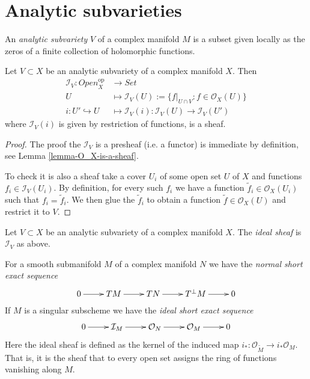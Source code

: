 \section{Analytic subvarieties}
\label{section-analytic-subvarieties}

\begin{definition}
\label{definition-analytic-subvariety}
\begin{reference}
\cite{GH}
\end{reference}
An {\it analytic subvariety} $V$ of a complex manifold $M$ is a
subset given locally as the zeros of a finite collection of holomorphic
functions.
\end{definition}

\begin{lemma}
\label{lemma-ideal-sheaf-is-a-sheaf}
Let $V \subset X$ be an analytic subvariety
of a complex manifold $X$.
Then
\begin{align*}
\mathcal{I}_V: \mathit{Open}^{\text{op}}_X &\longrightarrow \mathit{Set} \\
U &\longmapsto \mathcal{I}_V(U):=\{f|_{U\cap V}:f \in \mathcal{O}_X(U)\}\\
i:U' \hookrightarrow  U & \longmapsto 
\mathcal{I}_V(i):\mathcal{I}_V(U) \to \mathcal{I}_V(U')
\end{align*}
where $\mathcal{I}_V(i)$ is given by restriction of
functions,
is a sheaf.
\end{lemma}

\begin{proof}
The proof the $\mathcal{I}_V$ is a 
presheaf (i.e. a functor)
is immediate by definition,
see Lemma \ref{lemma-O_X-is-a-sheaf}.

To check it is also a sheaf take
a cover $U_i$ of some open set $U$ of $X$ and
functions $f_i \in \mathcal{I}_V(U_i)$.
By definition, for every such $f_i$ we have
a function $\tilde{f}_i \in \mathcal{O}_X(U_i)$ 
such that $f_i=\tilde{f}_i$.
We then glue the $\tilde{f}_i$
to obtain a function $\tilde{f} \in \mathcal{O}_X(U)$
and restrict it to $V$.
\end{proof}

\begin{definition}
\label{definition-ideal-sheaf}
Let $V \subset X$ be an analytic subvariety
of a complex manifold $X$.
The {\it ideal sheaf} is $\mathcal{I}_V$ as above.
\end{definition}

For a smooth submanifold $M$ of a complex manifold $N$ we have the {\it normal 
short exact sequence}
$$
\xymatrix{
0\ar[r]&TM\ar[r]&TN\ar[r]&T^\perp M\ar[r]&0
}
$$
If $M$ is a singular subscheme we have the {\it ideal short exact sequence}
$$
\xymatrix{
0\ar[r]&\mathcal{I}_M\ar[r]&\mathcal{O}_N\ar[r]&\mathcal{O}_M\ar[r]&0
}
$$
Here the ideal sheaf is defined as the kernel of the induced map 
$i_*:\mathcal{O}_{\widetilde{M}} \to i_*\mathcal{O}_M$. That is, it is the sheaf
that to every open set assigns the ring of functions vanishing along $M$.

